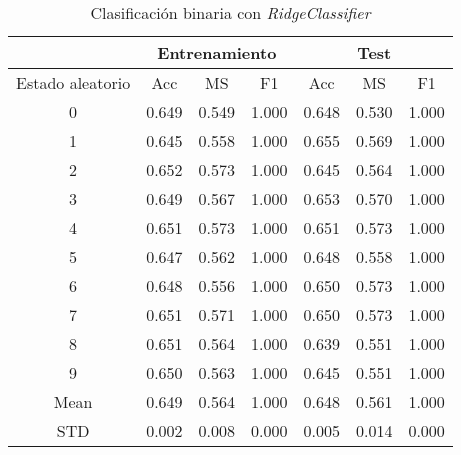 \begin{table}[th]
	\centering
	\begin{tabular}{ |c|c|c|c|c|c|c| }
		\hline
		\rowcolor{LightCyan}
		 & \multicolumn{3}{c|}{Entrenamiento} & \multicolumn{3}{c|}{Test} \\
		\hline
		\rowcolor{LightCyan}
		 Estado aleatorio & Acc & MS & F1 & Acc & MS & F1 \\
		\hline
		0 & 0.649 & 0.549 & 1.000 & 0.648 & 0.530 & 1.000 \\
		1 & 0.645 & 0.558 & 1.000 & 0.655 & 0.569 & 1.000 \\
		2 & 0.652 & 0.573 & 1.000 & 0.645 & 0.564 & 1.000 \\
		3 & 0.649 & 0.567 & 1.000 & 0.653 & 0.570 & 1.000 \\
		4 & 0.651 & 0.573 & 1.000 & 0.651 & 0.573 & 1.000 \\
		5 & 0.647 & 0.562 & 1.000 & 0.648 & 0.558 & 1.000 \\
		6 & 0.648 & 0.556 & 1.000 & 0.650 & 0.573 & 1.000 \\
		7 & 0.651 & 0.571 & 1.000 & 0.650 & 0.573 & 1.000 \\
		8 & 0.651 & 0.564 & 1.000 & 0.639 & 0.551 & 1.000 \\
		9 & 0.650 & 0.563 & 1.000 & 0.645 & 0.551 & 1.000 \\
		Mean & 0.649 & 0.564 & 1.000 & 0.648 & 0.561 & 1.000 \\
		STD & 0.002 & 0.008 & 0.000 & 0.005 & 0.014 & 0.000 \\
		\hline
	\end{tabular}
	\caption{Clasificación binaria con \textit{RidgeClassifier}}
	\label{tabla:ridge_bin}
\end{table}
